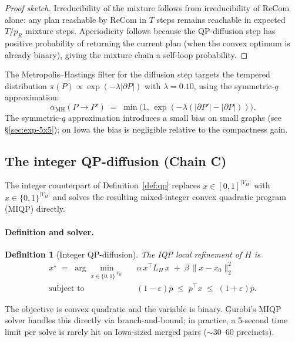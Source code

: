 \documentclass[11pt]{article}
\newtheorem{definition}{Definition}[section]
\begin{document}
\begin{proof}[Proof sketch]
Irreducibility of the mixture follows from irreducibility of ReCom
alone: any plan reachable by ReCom in $T$ steps remains reachable in
expected $T / p_R$ mixture steps. Aperiodicity follows because the
QP-diffusion step has positive probability of returning the current
plan (when the convex optimum is already binary), giving the mixture
chain a self-loop probability.
\end{proof}

The Metropolis--Hastings filter for the diffusion step targets the
tempered distribution $\pi(P) \propto \exp(-\lambda |\partial P|)$ with
$\lambda = 0.10$, using the symmetric-$q$ approximation:
\[
  \alpha_{\mathrm{MH}}(P \to P') \;=\; \min\!\bigl(1,\,
    \exp(-\lambda(|\partial P'| - |\partial P|))\bigr).
\]
The symmetric-$q$ approximation introduces a small bias on small
graphs (see \S\ref{sec:exp-5x5}); on Iowa the bias is negligible
relative to the compactness gain.

\subsection{The integer QP-diffusion (Chain C)}\label{sec:iqp}

The integer counterpart of Definition~\ref{def:qp} replaces
$x \in [0,1]^{|V_H|}$ with $x \in \{0, 1\}^{|V_H|}$ and solves the
resulting mixed-integer convex quadratic program (MIQP) directly.

\paragraph{Definition and solver.}\label{sec:iqp-def}

\begin{definition}[Integer QP-diffusion]\label{def:iqp}
The IQP local refinement of $H$ is
\begin{align}
  x^\star \;=\; \arg\min_{x \in \{0,1\}^{|V_H|}} \;\;
    & \alpha\, x^\top L_H\, x \;+\; \beta\, \|x - x_0\|_2^2 \label{eq:iqp-obj} \\
  \text{subject to} \;\;
    & (1 - \varepsilon) \bar p \;\le\; p^\top x \;\le\; (1 + \varepsilon) \bar p.
\end{align}
\end{definition}

The objective is convex quadratic and the variable is binary.
Gurobi's MIQP solver handles this directly via branch-and-bound; in
practice, a 5-second time limit per solve is rarely hit on Iowa-sized
merged pairs ($\sim 30$--$60$ precincts).
\end{document}
